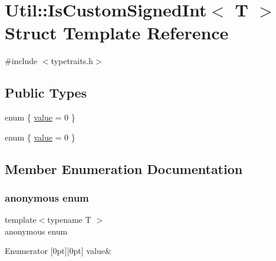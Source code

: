 \hypertarget{structUtil_1_1IsCustomSignedInt}{}\section{Util\+:\+:Is\+Custom\+Signed\+Int$<$ T $>$ Struct Template Reference}
\label{structUtil_1_1IsCustomSignedInt}


{\ttfamily \#include $<$typetraits.\+h$>$}

\subsection*{Public Types}
\begin{DoxyCompactItemize}
\item 
enum \{ \mbox{\hyperlink{structUtil_1_1IsCustomSignedInt_ac5c4706158727ee98b80c28042447712a74e59dedda69b8eac87a3962dc062774}{value}} = 0
 \}
\item 
enum \{ \mbox{\hyperlink{structUtil_1_1IsCustomSignedInt_ac5c4706158727ee98b80c28042447712a74e59dedda69b8eac87a3962dc062774}{value}} = 0
 \}
\end{DoxyCompactItemize}


\subsection{Member Enumeration Documentation}
\mbox{\label{structUtil_1_1IsCustomSignedInt_a28c4e4c118a6163a6772030ec9f767ce}} 
\subsubsection{\texorpdfstring{anonymous enum}{anonymous enum}}
{\footnotesize\ttfamily template$<$typename T $>$ \\
anonymous enum}

\begin{DoxyEnumFields}{Enumerator}
[0pt][0pt]{}\mbox{\label{structUtil_1_1IsCustomSignedInt_ac5c4706158727ee98b80c28042447712a74e59dedda69b8eac87a3962dc062774}} 
value&\\
\hline

\end{DoxyEnumFields}
\mbox{\label{structUtil_1_1IsCustomSignedInt_ac5c4706158727ee98b80c28042447712}} 
